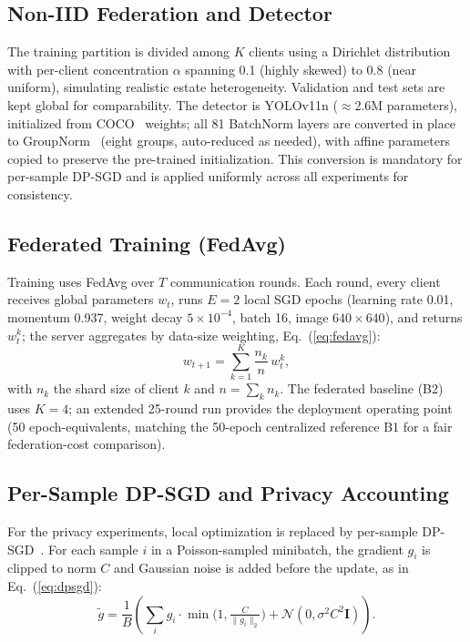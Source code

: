 \documentclass[twocolumn,a4paper,10pt]{article}
\begin{document}
\subsection{Non-IID Federation and Detector}
The training partition is divided among $K$ clients using a Dirichlet
distribution with per-client concentration $\alpha$ spanning 0.1 (highly skewed)
to 0.8 (near uniform), simulating realistic estate heterogeneity. Validation and
test sets are kept global for comparability. The detector is YOLOv11n
($\approx$2.6M parameters), initialized from COCO~\cite{coco} weights; all 81
BatchNorm layers are converted in place to GroupNorm~\cite{groupnorm} (eight
groups, auto-reduced as needed), with affine parameters copied to preserve the
pre-trained initialization. This conversion is mandatory for per-sample DP-SGD
and is applied uniformly across all experiments for consistency.

\subsection{Federated Training (FedAvg)}
Training uses FedAvg over $T$ communication rounds. Each round, every client
receives global parameters $w_t$, runs $E = 2$ local SGD epochs (learning rate
0.01, momentum 0.937, weight decay $5\times10^{-4}$, batch 16, image $640\times
640$), and returns $w_t^k$; the server aggregates by data-size weighting,
Eq.~(\ref{eq:fedavg}):
\begin{equation}
w_{t+1} = \sum_{k=1}^{K} \frac{n_k}{n}\, w_t^k,
\label{eq:fedavg}
\end{equation}
with $n_k$ the shard size of client $k$ and $n=\sum_k n_k$. The federated
baseline (B2) uses $K=4$; an extended 25-round run provides the deployment
operating point (50 epoch-equivalents, matching the 50-epoch centralized
reference B1 for a fair federation-cost comparison).

\subsection{Per-Sample DP-SGD and Privacy Accounting}
For the privacy experiments, local optimization is replaced by per-sample
DP-SGD~\cite{abadi2016}. For each sample $i$ in a Poisson-sampled minibatch,
the gradient $g_i$ is clipped to norm $C$ and Gaussian noise is added before
the update, as in Eq.~(\ref{eq:dpsgd}):
\begin{equation}
\tilde{g} = \frac{1}{B}\!\left( \sum_{i} g_i \cdot
\min\!\Big(1, \tfrac{C}{\lVert g_i\rVert_2}\Big) +
\mathcal{N}(0, \sigma^2 C^2 \mathbf{I}) \right).
\label{eq:dpsgd}
\end{equation}
\end{document}
